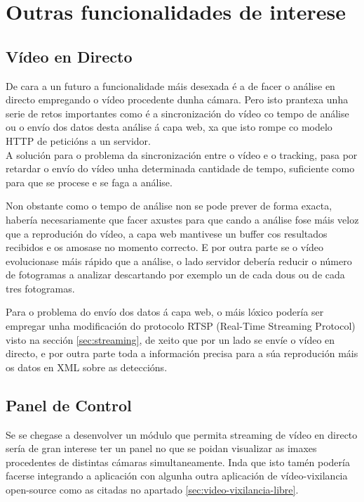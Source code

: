     
    \section{Outras funcionalidades de interese}
    
        \subsection{Vídeo en Directo}
            De cara a un futuro a funcionalidade máis desexada é a de facer o análise en directo 
            empregando o vídeo procedente dunha cámara. Pero isto prantexa unha serie de retos 
            importantes como é a sincronización do vídeo co tempo de análise ou o envío dos datos desta 
            análise á capa web, xa que isto rompe co modelo HTTP de peticións a un servidor.\\
            
            A solución para o problema da sincronización entre o vídeo e o tracking, pasa por retardar o
            envío do vídeo unha determinada cantidade de tempo, suficiente como para que se procese e se
            faga a análise.
            
            Non obstante como o tempo de análise non se pode prever de forma exacta, habería
            necesariamente que facer axustes para que cando a análise fose máis veloz que a reprodución
            do vídeo, a capa web mantivese un buffer cos resultados recibidos e os amosase no momento 
            correcto. E por outra parte se o vídeo evolucionase máis rápido que a análise, o lado 
            servidor debería reducir o número de fotogramas a analizar descartando por exemplo un de
            cada dous ou de cada tres fotogramas.
            
            Para o problema do envío dos datos á capa web, o máis lóxico podería ser empregar unha 
            modificación do protocolo RTSP (Real-Time Streaming Protocol) visto na sección 
            \ref{sec:streaming}, de xeito que por un lado se envíe o vídeo en directo, e por outra parte
            toda a información precisa para a súa reprodución máis os datos en XML sobre as deteccións.
        
        \subsection{Panel de Control}
            Se se chegase a desenvolver un módulo que permita streaming de vídeo en directo sería de
            gran interese ter un panel no que se poidan visualizar as imaxes procedentes de 
            distintas cámaras simultaneamente. Inda que isto tamén podería facerse integrando a 
            aplicación con algunha outra aplicación de vídeo-vixilancia open-source como as citadas 
            no apartado \ref{sec:video-vixilancia-libre}.
  
  
  
  
  
  
  
  
  
  
